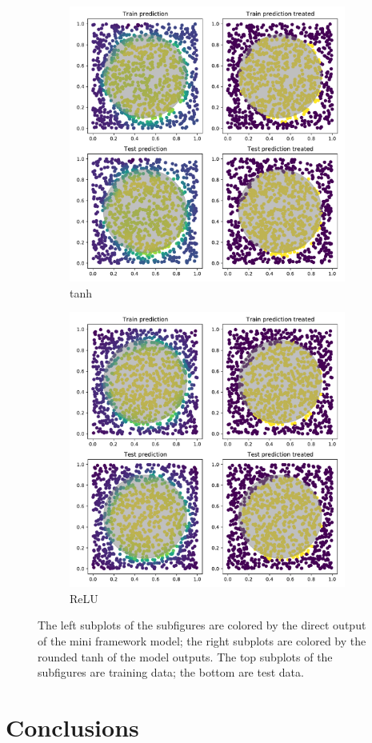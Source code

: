 \documentclass[prl, article, twocolumn]{revtex4-1}
\begin{document}
\begin{figure}[h!]
    \begin{subfigure}[]{0.45\linewidth}
        \includegraphics[width=\textwidth]{figures/tanh_points.pdf}
        \caption{tanh}
    \end{subfigure}
    \begin{subfigure}[]{0.45\linewidth}
        \includegraphics[width=\textwidth]{figures/relu_points.pdf}
        \caption{ReLU}
    \end{subfigure}
    \caption{The left subplots of the subfigures are colored by the direct output of the mini framework model; the right subplots are colored by the rounded tanh of the model outputs. The top subplots of the subfigures are training data; the bottom are test data.}
    \label{fig:points}
\end{figure}

\section{Conclusions}
\end{document}
